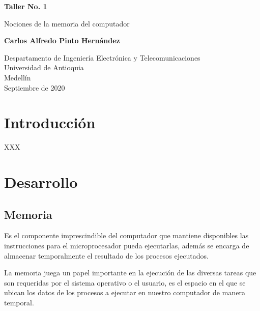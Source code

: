 \documentclass{article}
\begin{document}
\begin{titlepage}
    \begin{center}
        \vspace*{1cm}
            
        \Huge
        \textbf{Taller No. 1}
            
        \vspace{0.5cm}
        \LARGE
        Nociones de la memoria del computador
            
        \vspace{1.5cm}
            
        \textbf{Carlos Alfredo Pinto Hernández}
            
        \vfill
            
        \vspace{0.8cm}
            
        \Large
        Despartamento de Ingeniería Electrónica y Telecomunicaciones\\
        Universidad de Antioquia\\
        Medellín\\
        Septiembre de 2020
            
    \end{center}
\end{titlepage}

\tableofcontents

\section{Introducción}
XXX

\section{Desarrollo} \label{contenido}
\subsection{Memoria}
Es el componente imprescindible del computador que mantiene disponibles las instrucciones para el microprocesador pueda ejecutarlas, además se encarga de almacenar temporalmente el resultado de los procesos ejecutados.\cite{EcuRed}

La memoria juega un papel importante en la ejecución de las diversas tareas que son requeridas por el sistema operativo o el usuario, es el espacio en el que se ubican los datos de los procesos a ejecutar en nuestro computador de manera temporal.
\end{document}
